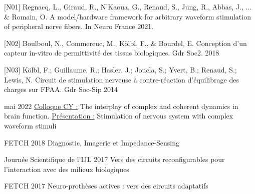 \begin{cvskills}   
  \cvskill
    {[N01]} %
    {Regnacq, L., Giraud, R., N'Kaoua, G., Renaud, S., Jung, R., Abbas, J., ... \& Romain, O. A model/hardware framework for arbitrary waveform stimulation of peripheral nerve fibers. In Neuro France 2021. } %
\end{cvskills}
\begin{cvskills}   
  \cvskill
    {[N02]} %
    {Boulboul, N., Commereuc, M., Kölbl, F., \& Bourdel, E. Conception d’un capteur in-vitro de permittivité des tissus biologiques. Gdr Soc2. 2018} %
\end{cvskills}
\begin{cvskills}   
  \cvskill
    {[N03]} %
    {Kölbl, F.; Guillaume, R.; Hasler, J.; Joucla, S.; Yvert, B.; Renaud, S.; Lewis, N. Circuit de stimulation nerveuse à contre-réaction d’équilibrage des charges sur FPAA. Gdr Soc-Sip 2014} %
\end{cvskills}

\begin{cvskills}   
  \cvskill
     {mai 2022} %
    {\underline{Colloque CY :} The interplay of complex and coherent dynamics in brain function. \underline{Présentation :} Stimulation of nervous system with complex waveform stimuli} %
\end{cvskills}
\begin{cvskills}   
  \cvskill
    {FETCH 2018} %
    {Diagnostic, Imagerie et Impedance-Sensing } %
\end{cvskills}
\begin{cvskills}   
  \cvskill
    {Journée Scientifique de l’IJL 2017} %
    {Vers des circuits reconfigurables pour l’interaction avec des milieux biologiques} %
\end{cvskills}
\begin{cvskills}   
  \cvskill
    {FETCH 2017} %
    {Neuro-prothèses actives : vers des circuits adaptatifs} %
\end{cvskills}